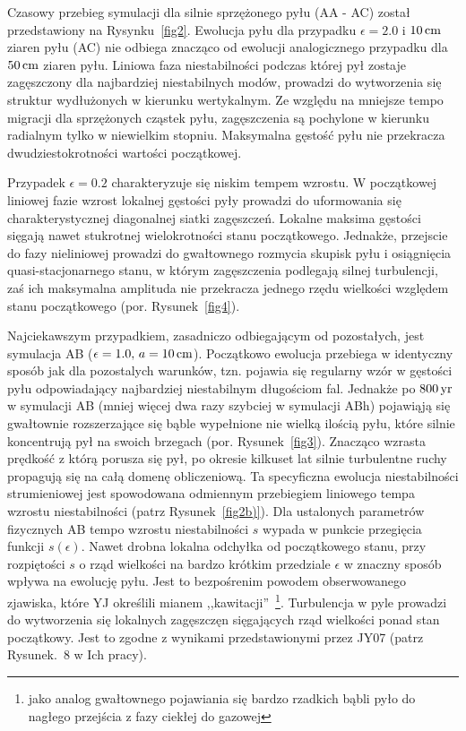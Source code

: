 Czasowy przebieg symulacji dla silnie sprzężonego pyłu (AA - AC) został
przedstawiony na Rysynku~\ref{fig2}. Ewolucja pyłu dla przypadku $\epsilon =
2.0$ i $10\hbox{$\thinspace\textrm{cm}$}$ ziaren pyłu (AC) nie odbiega znacząco od ewolucji analogicznego
przypadku dla $50\hbox{$\thinspace\textrm{cm}$}$ ziaren pyłu. Liniowa faza niestabilności podczas której
pył zostaje zagęszczony dla najbardziej niestabilnych modów, prowadzi do
wytworzenia się struktur wydłużonych w kierunku wertykalnym. Ze względu na
mniejsze tempo migracji dla sprzężonych cząstek pyłu, zagęszczenia są pochylone
w kierunku radialnym tylko w niewielkim stopniu. Maksymalna gęstość pyłu nie
przekracza dwudziestokrotności wartości początkowej.
\par Przypadek $\epsilon = 0.2$ charakteryzuje się niskim tempem wzrostu. W
początkowej liniowej fazie wzrost lokalnej gęstości pyły prowadzi do uformowania
się charakterystycznej diagonalnej siatki zagęszczeń. Lokalne maksima gęstości
sięgają nawet stukrotnej wielokrotności stanu początkowego. Jednakże, przejscie
do fazy nieliniowej prowadzi do gwałtownego rozmycia skupisk pyłu i osiągnięcia
quasi-stacjonarnego stanu, w którym zagęszczenia podlegają silnej turbulencji,
zaś ich maksymalna amplituda nie przekracza jednego rzędu wielkości względem
stanu początkowego (por. Rysunek~\ref{fig4}).

\par Najciekawszym przypadkiem, zasadniczo odbiegającym od pozostałych, jest
symulacja AB ($\epsilon=1.0,\, a=10\hbox{$\thinspace\textrm{cm}$}$). Początkowo ewolucja przebiega w
identyczny sposób jak dla pozostalych warunków, tzn. pojawia się regularny wzór
w gęstości pyłu odpowiadający najbardziej niestabilnym długościom fal. Jednakże 
po $800\hbox{$\thinspace\textrm{yr}$}$ w symulacji AB (mniej więcej dwa razy szybciej w symulacji ABh)
pojawiąją się gwałtownie rozszerzające się bąble wypełnione nie wielką ilością
pyłu, które silnie koncentrują pył na swoich brzegach (por. Rysunek~\ref{fig3}). 
Znacząco wzrasta prędkość z którą porusza się pył, po okresie kilkuset lat
silnie turbulentne ruchy propagują się na całą domenę obliczeniową. Ta
specyficzna ewolucja niestabilności strumieniowej jest spowodowana odmiennym
przebiegiem liniowego tempa wzrostu niestabilności (patrz Rysunek~\ref{fig2b)}).
Dla ustalonych parametrów fizycznych AB tempo wzrostu niestabilności $s$ wypada w
punkcie przegięcia funkcji $s(\epsilon)$. Nawet drobna lokalna odchyłka od
początkowego stanu, przy rozpiętości $s$ o rząd wielkości na bardzo krótkim
przedziale $\epsilon$ w znaczny sposób wpływa na ewolucję pyłu. Jest to
bezpośrenim powodem obserwowanego zjawiska, które YJ określili mianem
,,kawitacji''~\footnote{jako analog gwałtownego pojawiania się bardzo rzadkich
   bąbli pyło do nagłego przejścia z fazy ciekłej do gazowej}.
Turbulencja w pyle prowadzi do wytworzenia się lokalnych zagęszczęn sięgających
rząd wielkości ponad stan początkowy. Jest to zgodne z wynikami przedstawionymi
przez JY07 (patrz Rysunek.~8 w Ich pracy).

